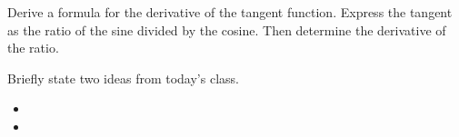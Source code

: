 \begin{problem}
  \clearpage

\item Derive a formula for the derivative of the tangent
  function. Express the tangent as the ratio of the sine divided by
  the cosine. Then determine the derivative of the ratio.


  \vfill

\end{problem}

\postClass

\begin{problem}
\item Briefly state two ideas from today's class.
  \begin{itemize}
  \item
  \item
  \end{itemize}
\item
  \begin{subproblem}
    \item
  \end{subproblem}
\end{problem}




